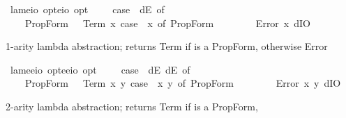 \begin{isabellebody}
\begin{isamarkuptext}
\end{isamarkuptext}%
\isamarkuptrue%
\isamarkupfalse%
\ lam{}{\isacharcolon}{\isacharcolon}{\isachardoublequoteopen}{\isacharparenleft}e{\isasymRightarrow}io\ opt{\isacharparenright}{\isasymRightarrow}{\isacharparenleft}e{\isasymRightarrow}io{\isacharparenright}\ opt{\isachardoublequoteclose}\ \ {\isachardoublequoteopen}{\isasymlambda}\ {\isasymPhi}\ {\isasymequiv}\ case\ {\isacharparenleft}{\isasymPhi}\ dE{\isacharparenright}\ of\isanewline
\ \ \ \ PropForm\ {\isasymphi}\ {\isasymRightarrow}\ Term\ {\isacharparenleft}{\isasymlambda}x{\isachardot}\ case\ {\isacharparenleft}{\isasymPhi}\ x{\isacharparenright}\ of\ PropForm\ {\isasymphi}\ {\isasymRightarrow}\ {\isasymphi}{\isacharparenright}\isanewline
\ \ {\isacharbar}\ {\isacharunderscore}\ {\isasymRightarrow}\ Error\ {\isacharparenleft}{\isasymlambda}x{\isachardot}\ dIO{\isacharparenright}{\isachardoublequoteclose}%
\begin{isamarkuptext}%
1-arity lambda abstraction;  returns Term  if \isa{{\isasymphi}} is a PropForm, 
otherwise Error%
\end{isamarkuptext}%
\isamarkuptrue%
\isamarkupfalse%
\ lam{}{\isacharcolon}{\isacharcolon}{\isachardoublequoteopen}{\isacharparenleft}e{\isasymRightarrow}e{\isasymRightarrow}io\ opt{\isacharparenright}{\isasymRightarrow}{\isacharparenleft}e{\isasymRightarrow}e{\isasymRightarrow}io{\isacharparenright}\ opt{\isachardoublequoteclose}\ \ {\isachardoublequoteopen}{\isasymlambda}\ {\isasymPhi}\ {\isasymequiv}\ case\ {\isacharparenleft}{\isasymPhi}\ dE\ dE{\isacharparenright}\ of\isanewline
\ \ \ \ PropForm\ {\isasymphi}\ {\isasymRightarrow}\ Term\ {\isacharparenleft}{\isasymlambda}x\ y{\isachardot}\ case\ {\isacharparenleft}{\isasymPhi}\ x\ y{\isacharparenright}\ of\ PropForm\ {\isasymphi}\ {\isasymRightarrow}\ {\isasymphi}{\isacharparenright}\isanewline
\ \ {\isacharbar}\ {\isacharunderscore}\ {\isasymRightarrow}\ Error\ {\isacharparenleft}{\isasymlambda}x\ y{\isachardot}\ dIO{\isacharparenright}{\isachardoublequoteclose}%
\begin{isamarkuptext}%
2-arity lambda abstraction;  returns Term  if \isa{{\isasymphi}} is a PropForm, 

\end{isamarkuptext}
\end{isabellebody}
